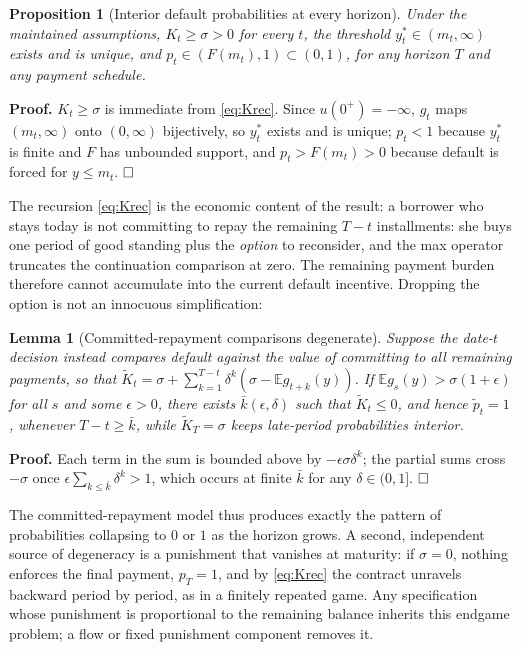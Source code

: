 \documentclass[12pt,english]{article}
\newtheorem{lemma}[theorem]{Lemma}
\newtheorem{proposition}[theorem]{Proposition}
\begin{document}
\begin{proposition}[Interior default probabilities at every horizon]\label{prop:interiorT}
Under the maintained assumptions, $K_t \ge \sigma > 0$ for every $t$, the threshold $y_t^* \in (m_t, \infty)$ exists and is unique, and $p_t \in (F(m_t), 1) \subset (0,1)$, for any horizon $T$ and any payment schedule.
\end{proposition}

\noindent\textbf{Proof.} $K_t \ge \sigma$ is immediate from \eqref{eq:Krec}. Since $u(0^+) = -\infty$, $g_t$ maps $(m_t,\infty)$ onto $(0,\infty)$ bijectively, so $y_t^*$ exists and is unique; $p_t < 1$ because $y_t^*$ is finite and $F$ has unbounded support, and $p_t > F(m_t) > 0$ because default is forced for $y \le m_t$. $\hfill\square$

The recursion \eqref{eq:Krec} is the economic content of the result: a borrower who stays today is not committing to repay the remaining $T-t$ installments: she buys one period of good standing plus the \emph{option} to reconsider, and the max operator truncates the continuation comparison at zero. The remaining payment burden therefore cannot accumulate into the current default incentive. Dropping the option is not an innocuous simplification:

\begin{lemma}[Committed-repayment comparisons degenerate]\label{lem:committedT}
Suppose the date-$t$ decision instead compares default against the value of committing to all remaining payments, so that $\tilde K_t = \sigma + \sum_{k=1}^{T-t}\delta^k(\sigma - \mathbb{E}g_{t+k}(y))$. If $\mathbb{E}g_s(y) > \sigma(1+\epsilon)$ for all $s$ and some $\epsilon > 0$, there exists $\bar k(\epsilon,\delta)$ such that $\tilde K_t \le 0$, and hence $\tilde p_t = 1$, whenever $T - t \ge \bar k$, while $\tilde K_T = \sigma$ keeps late-period probabilities interior.
\end{lemma}

\noindent\textbf{Proof.} Each term in the sum is bounded above by $-\epsilon\sigma\delta^k$; the partial sums cross $-\sigma$ once $\epsilon\sum_{k\le\bar k}\delta^k > 1$, which occurs at finite $\bar k$ for any $\delta \in (0,1]$. $\hfill\square$

The committed-repayment model thus produces exactly the pattern of probabilities collapsing to $0$ or $1$ as the horizon grows. A second, independent source of degeneracy is a punishment that vanishes at maturity: if $\sigma = 0$, nothing enforces the final payment, $p_T = 1$, and by \eqref{eq:Krec} the contract unravels backward period by period, as in a finitely repeated game. Any specification whose punishment is proportional to the remaining balance inherits this endgame problem; a flow or fixed punishment component removes it.
\end{document}
